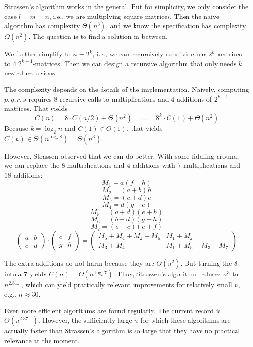 Strassen's algorithm works in the general.
But for simplicity, we only consider the case $l=m=n$, i.e., we are multiplying square matrices.
Then the naive algorithm has complexity $\Theta(n^3)$, and we know the specification has complexity $\Omega(n^2)$.
The question is to find a solution in between.

We further simplify to $n=2^k$, i.e., we can recursively subdivide our $2^k$-matrices to $4$ $2^{k-1}$-matrices.
Then we can design a recursive algorithm that only needs $k$ nested recursions.

The complexity depends on the details of the implementation.
Naively, computing $p,q,r,s$ requires $8$ recursive calls to multiplications and $4$ additions of $2^{k-1}$-matrices.
That yields
 \[C(n)=8\cdot C(n/2) + \Theta(n^2) = \ldots = 8^k\cdot C(1)+\Theta(n^2)\]
Because $k=\log_2 n$ and $C(1)\in O(1)$, that yields $C(n)\in\Theta(n^{\log_2 8})=\Theta(n^3)$.

However, Strassen observed that we can do better.
With some fiddling around, we can replace the $8$ multiplications and $4$ additions with $7$ multiplications and $18$ additions:
\[M_1 = a(f-h)\]
\[M_2 = (a+b)h\]
\[M_3 = (c+d)e\]
\[M_4 = d(g-e)\]
\[M_5 = (a+d)(e+h)\]
\[M_6 = (b-d)(g+h)\]
\[M_7 = (a-c)(e+f)\]
\[\begin{pmatrix} a & b \\ c & d\end{pmatrix}\cdot \begin{pmatrix} e & f \\ g & h\end{pmatrix}=
  \begin{pmatrix} M_5 + M_4 + M_2 + M_6 & M_1 + M_2 \\ M_3 + M_4 & M_1 + M_5 - M_3 - M_7 \end{pmatrix}\]

The extra additions do not harm because they are $\Theta(n^2)$.
But turning the $8$ into a $7$ yields $C(n)=\Theta(n^{\log_2 7})$.
Thus, Strassen's algorithm reduces $n^3$ to $n^{2.81\ldots}$, which can yield practically relevant improvements for relatively small $n$, e.g., $n\approx 30$.
\medskip

Even more efficient algorithms are found regularly.
The current record is $\Theta(n^{2.37\ldots})$.
However, the sufficiently large $n$ for which these algorithms are actually faster than Strassen's algorithm is so large that they have no practical relevance at the moment.

